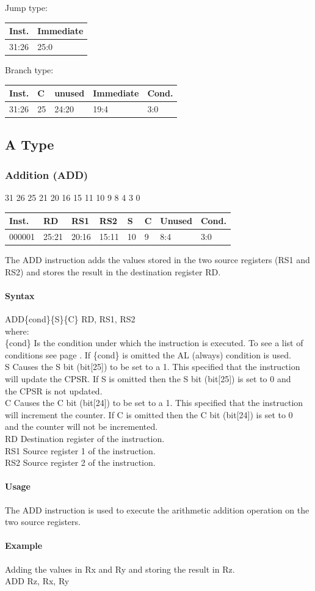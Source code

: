 \documentclass[12pt]{article}
\newcommand{\aTypeInstruction}[6]
{%
    \hspace{1.6cm}31 \hspace{1.15cm}26 \hspace{.04cm}25 \hspace{.8cm}21 \hspace{.04cm}20 \hspace{.8cm}16 \hspace{.04cm}15 \hspace{.8cm}11 \hspace{.04cm}10 \hspace{.275cm}9 \hspace{.275cm}8 \hspace{1.175cm}4 \hspace{.04cm}3 \hspace{1.25cm}0
    \vspace{-.25cm}
    \begin{center}
        \begin{tabular}{ |p{1.8cm}|p{1.5cm}|p{1.5cm}|p{1.5cm}|p{0.3cm}|p{0.3cm}|p{1.5cm}|p{1.5cm}| }
            \hline
            \textbf{Inst.} & \textbf{RD}& \textbf{RS1} & \textbf{RS2} & \textbf{S} & \textbf{C} & Unused & \textbf{Cond.}\\
            \hline
            #1 & 25:21 & 20:16 & 15:11 & 10 & 9 & 8:4 &3:0\\
            \hline
        \end{tabular}
    \end{center}
    
    \noindent
    #2\\
    
    \paragraph{Syntax}
    \begin{flushleft}
    #3\{cond\}\{S\}\{C\} RD, RS1, RS2\\
    \vspace{1em}        %
    where:\\
    \vspace{1em}
    \{cond\}    \hspace{2em} Is the condition under which the instruction is executed. To see a list of\\
                \hspace{5.4em} conditions see page . If \{cond\} is omitted the AL (always) condition is used.\\
    \vspace{1em}    
    S       \hspace{4.5em} Causes the S bit (bit[25]) to be set to a 1. This specified that the instruction\\
            \hspace{5.4em} will update the CPSR. If S is omitted then the S bit (bit[25]) is set to 0 and\\
            \hspace{5.4em} the CPSR is not updated.\\
    \vspace{1em}    
    C       \hspace{4.5em} Causes the C bit (bit[24]) to be set to a 1. This specified that the instruction\\
            \hspace{5.4em} will increment the counter. If C is omitted then the C bit (bit[24]) is set to 0\\
            \hspace{5.4em} and the counter will not be incremented.\\
    \vspace{1em}
    RD  \hspace{3.6em} Destination register of the instruction.\\
    \vspace{1em}
    RS1  \hspace{3.35em} Source register 1 of the instruction.\\
    \vspace{1em}
    RS2  \hspace{3.35em} Source register 2 of the instruction.\\
    \end{flushleft}
    
    \paragraph{Usage}
    \begin{flushleft}
    #4\\
    \end{flushleft}
    \paragraph{Example}
    \begin{flushleft}
    #5\\
    \vspace{1em}
    #6
    \end{flushleft}
    }
\begin{document}
    \begin{center}
        Jump type:\\
        \vspace{1em}
        \begin{tabular}{ |p{1.8cm}|p{10.7cm}| }
            \hline
            \textbf{Inst.} & \textbf{Immediate}\\
            \hline
            31:26& 25:0\\
            \hline
        \end{tabular}
    \end{center}
    
    \begin{center}
        Branch type:\\
        \vspace{1em}
        \begin{tabular}{|p{1.8cm}|p{.3cm}|p{1.1cm}|p{6.5cm}|p{1.5cm}| }
            \hline
            \textbf{Inst.} & \textbf{C} & unused &\textbf{Immediate}&\textbf{Cond.}\\
            \hline
            31:26& 25 & 24:20 &19:4 &3:0\\
            \hline
        \end{tabular}
    \end{center}
    
\newpage
\subsection{A Type}



    
    \subsubsection{Addition (ADD)}
    
    \aTypeInstruction{000001}
    {The ADD instruction adds the values stored in the two source registers (RS1 and RS2) and stores the result in the destination register RD.}
    {ADD}
    {The ADD instruction is used to execute the arithmetic addition operation on the two source registers.}
    {Adding the values in Rx and Ry and storing the result in Rz.}
    {ADD Rz, Rx, Ry}
\end{document}
